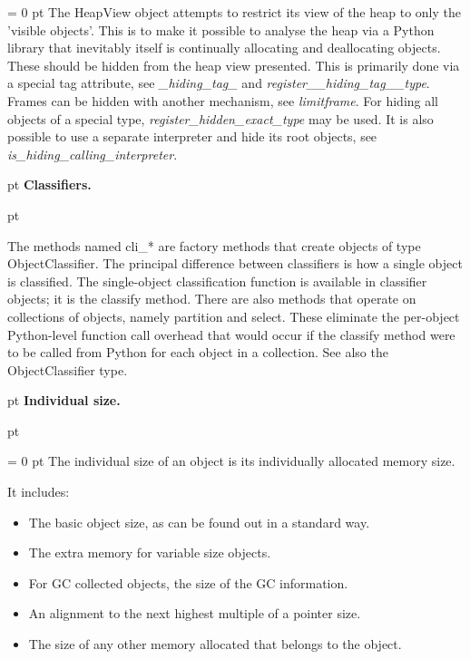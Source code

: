 {{{} \noindent
{\par \parindent = 0 pt 
The HeapView object attempts to restrict its view of the heap to only
the 'visible objects'. This is to make it possible to analyse the heap
via a Python library that inevitably itself is continually allocating
and deallocating objects. These should be hidden from the heap view
presented. This is primarily done via a special tag attribute, see  {\em {\_}hiding{\_}tag{\_}\/} and  {\em register{\_}{\_}hiding{\_}tag{\_}{\_}type\/}. Frames can be hidden
with another mechanism, see  {\em limitframe\/}. For hiding all objects of a special type,  {\em register{\_}hidden{\_}exact{\_}type\/} may be used. It is also
possible to use a separate interpreter and hide its root objects, see  {\em is{\_}hiding{\_}calling{\_}interpreter\/}.
 \par}
{\par \pagebreak[2]  pt \noindent
{\large {\bf  Classifiers.\/}}\par {} pt
} \noindent
The methods named cli{\_}* are factory methods that create objects of
type ObjectClassifier. The principal difference between classifiers is
how a single object is classified. The single-object classification
function is available in classifier objects; it is the classify
method. There are also methods that operate on collections of objects,
namely partition and select. These eliminate the per-object
Python-level function call overhead that would occur if the classify
method were to be called from Python for each object in a collection.
See also the ObjectClassifier type.
{\par \pagebreak[2]  pt \noindent
{\large {\bf  Individual size.\/}}\par {} pt
} \noindent
{\par \parindent = 0 pt 
The individual size of an object is its individually allocated memory size.
 \par}
{\par 
It includes:
 \par}
\begin{itemize}
\item  The basic object size, as can be found out in a standard way.\item  The extra memory for variable size objects.\item  For GC collected objects, the size of the GC information.\item  An alignment to the next highest multiple of a pointer size.\item  The size of any other memory allocated that belongs to the object.\end{itemize}
{\par 

}}}
